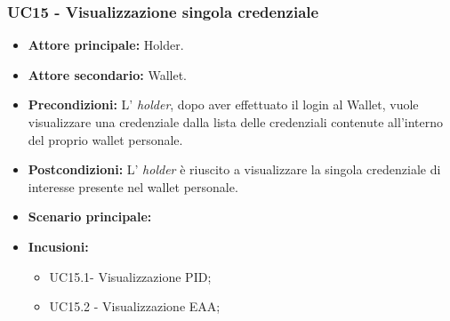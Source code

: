 \subsubsection{UC15 - Visualizzazione singola credenziale}
\begin{itemize}
\item \textbf{Attore principale:} Holder.
\item \textbf{Attore secondario:} Wallet. 
\item \textbf{Precondizioni:} L’ \textit{holder}, dopo aver effettuato il login al Wallet, vuole visualizzare una credenziale dalla lista delle credenziali contenute all'interno del proprio wallet personale. 
\item \textbf{Postcondizioni:} L’ \textit{holder} è riuscito a visualizzare la singola credenziale di interesse presente nel wallet personale.
\item \textbf{Scenario principale:} 
\item \textbf{Incusioni:}
    \begin{itemize}
    \item UC15.1- Visualizzazione PID;
    \item UC15.2 - Visualizzazione EAA;
    \end{itemize}
\end{itemize}

